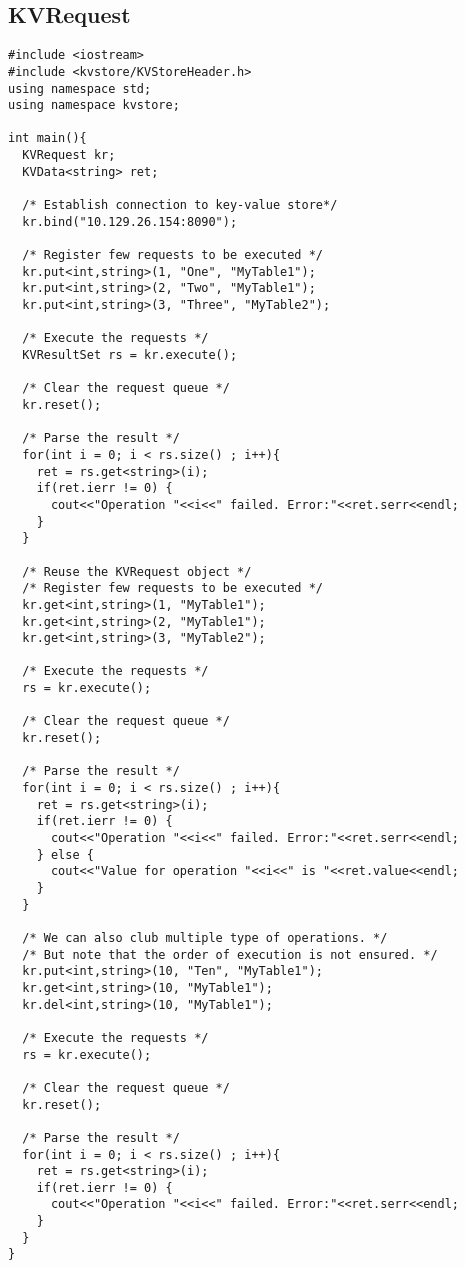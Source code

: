 \documentclass[11pt]{article}
\begin{document}
\subsection{KVRequest}
\begin{lstlisting}
#include <iostream>
#include <kvstore/KVStoreHeader.h>
using namespace std;
using namespace kvstore;

int main(){
  KVRequest kr;
  KVData<string> ret;
  
  /* Establish connection to key-value store*/
  kr.bind("10.129.26.154:8090");
  
  /* Register few requests to be executed */
  kr.put<int,string>(1, "One", "MyTable1");
  kr.put<int,string>(2, "Two", "MyTable1");
  kr.put<int,string>(3, "Three", "MyTable2");
  
  /* Execute the requests */
  KVResultSet rs = kr.execute();
  
  /* Clear the request queue */
  kr.reset();
  
  /* Parse the result */
  for(int i = 0; i < rs.size() ; i++){
    ret = rs.get<string>(i);
    if(ret.ierr != 0) {
      cout<<"Operation "<<i<<" failed. Error:"<<ret.serr<<endl;
    }
  }
  
  /* Reuse the KVRequest object */
  /* Register few requests to be executed */
  kr.get<int,string>(1, "MyTable1");
  kr.get<int,string>(2, "MyTable1");
  kr.get<int,string>(3, "MyTable2");
  
  /* Execute the requests */
  rs = kr.execute();
  
  /* Clear the request queue */
  kr.reset();
  
  /* Parse the result */
  for(int i = 0; i < rs.size() ; i++){
    ret = rs.get<string>(i);
    if(ret.ierr != 0) {
      cout<<"Operation "<<i<<" failed. Error:"<<ret.serr<<endl;
    } else {
      cout<<"Value for operation "<<i<<" is "<<ret.value<<endl;
    }
  }
  
  /* We can also club multiple type of operations. */
  /* But note that the order of execution is not ensured. */
  kr.put<int,string>(10, "Ten", "MyTable1");
  kr.get<int,string>(10, "MyTable1");
  kr.del<int,string>(10, "MyTable1");
  
  /* Execute the requests */
  rs = kr.execute();
  
  /* Clear the request queue */
  kr.reset();
  
  /* Parse the result */
  for(int i = 0; i < rs.size() ; i++){
    ret = rs.get<string>(i);
    if(ret.ierr != 0) {
      cout<<"Operation "<<i<<" failed. Error:"<<ret.serr<<endl;
    }
  }
}
\end{lstlisting}
\end{document}
